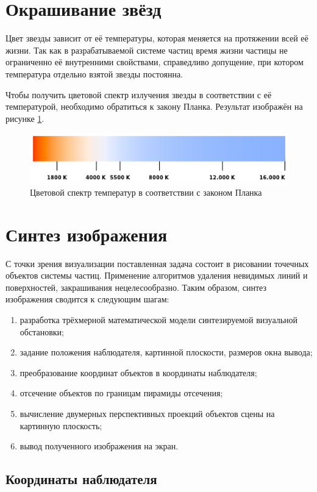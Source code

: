 \section{Окрашивание звёзд}
Цвет звезды зависит от её температуры, которая меняется на протяжении всей её жизни. Так как в разрабатываемой системе частиц время жизни частицы не ограниченно её внутренними свойствами, справедливо допущение, при котором температура отдельно взятой звезды постоянна.

Чтобы получить цветовой спектр излучения звезды в соответствии с её температурой, необходимо обратиться к закону Планка\cite{specrend}. Результат изображён на рисунке \ref{img:spectrum}.
\begin{figure}[H]
    \centering
    \includegraphics[scale=0.6]{image/spectrum.png}
    \caption{Цветовой спектр температур в соответствии с законом Планка}
    \label{img:spectrum}
\end{figure}

\section{Синтез изображения}
С точки зрения визуализации поставленная задача состоит в рисовании точечных объектов системы частиц. Применение алгоритмов удаления невидимых линий и поверхностей, закрашивания нецелесообразно. Таким образом, синтез изображения сводится к следующим шагам:
\begin{enumerate}
    \item разработка трёхмерной математической модели синтезируемой визуальной обстановки;
    \item задание положения наблюдателя, картинной плоскости, размеров окна вывода;
     \item преобразование координат объектов в координаты наблюдателя;
    \item отсечение объектов по границам пирамиды отсечения;
    \item вычисление двумерных перспективных проекций объектов сцены на картинную плоскость;
    \item вывод полученного изображения на экран.
\end{enumerate}

\subsection{Координаты наблюдателя}

